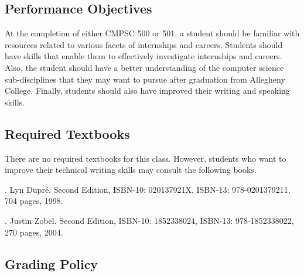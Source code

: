 \subsection*{Performance Objectives}

At the completion of either CMPSC 500 or 501, a student should be familiar with resources related to various facets of
internships and careers. Students should have skills that enable them to effectively investigate internships and
careers.  Also, the student should have a better understanding of the computer science sub-disciplines that they may
want to pursue after graduation from Allegheny College. Finally, students should also have improved their writing and
speaking skills.

\subsection*{Required Textbooks}

\noindent
There are no required textbooks for this class.  However, students who want to improve their technical writing skills
may consult the following books.

. Lyn Dupr\'e. Second Edition,  ISBN-10: 020137921X,
ISBN-13: 978-0201379211, 704 pages, 1998.

.  Justin Zobel. Second Edition,  ISBN-10: 1852338024, ISBN-13:
978-1852338022, 270 pages, 2004.

\subsection*{Grading Policy}

% 
% 

